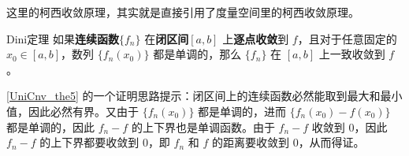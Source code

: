 这里的柯西收敛原理，其实就是直接引用了度量空间里的柯西收敛原理。

\begin{theorem}{Dini定理}\label{UniCnv_the5}
如果\textbf{连续函数}$\{f_n\}$ 在\textbf{闭区间}$[a, b]$ 上\textbf{逐点收敛}到 $f$，且对于任意固定的 $x_0\in [a, b]$，数列 $\{f_n(x_0)\}$ 都是单调的，那么 $\{f_n\}$ 在 $[a, b]$ 上一致收敛到 $f$。
\end{theorem}

\autoref{UniCnv_the5} 的一个证明思路提示：闭区间上的连续函数必然能取到最大和最小值，因此必然有界。又由于 $\{f_n(x_0)\}$ 都是单调的，进而 $\{f_n(x_0)-f(x_0)\}$ 都是单调的，因此 $f_n-f$ 的上下界也是单调函数。由于 $f_n-f$ 收敛到 $0$，因此 $f_n-f$ 的上下界都要收敛到 $0$，即 $f_n$ 和 $f$ 的距离要收敛到 $0$，从而得证。









